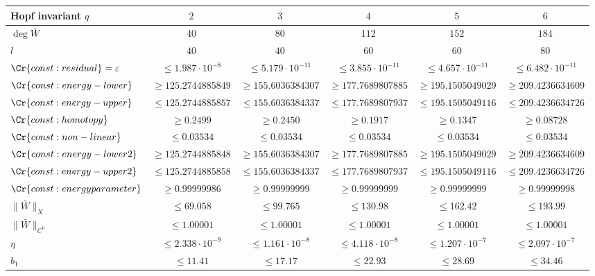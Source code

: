 \begin{table}[H]
\centering\small
\begin{tabular}{lccccc}
\toprule
Hopf invariant $q$ & $2$ & $3$ & $4$ & $5$ & $6$\\
\midrule
$\deg\bar W$ & $40$ & $80$ & $112$ & $152$ & $184$\\
$l$ & $40$ & $40$ & $60$ & $60$ & $80$\\
$\Cr{const:residual}=\varepsilon$ & $\le 1.987\cdot 10^{-8}$ & $\le 5.179\cdot 10^{-11}$ & $\le 3.855\cdot 10^{-11}$ & $\le 4.657\cdot 10^{-11}$ & $\le 6.482\cdot 10^{-11}$\\
$\Cr{const:energy-lower}$ & $\ge 125.2744885849$ & $\ge 155.6036384307$ & $\ge 177.7689807885$ & $\ge 195.1505049029$ & $\ge 209.4236634609$\\
$\Cr{const:energy-upper}$ & $\le 125.2744885857$ & $\le 155.6036384337$ & $\le 177.7689807937$ & $\le 195.1505049116$ & $\le 209.4236634726$\\
$\Cr{const:homotopy}$ & $\ge 0.2499$ & $\ge 0.2450$ & $\ge 0.1917$ & $\ge 0.1347$ & $\ge 0.08728$\\
$\Cr{const:non-linear}$ & $\le 0.03534$ & $\le 0.03534$ & $\le 0.03534$ & $\le 0.03534$ & $\le 0.03534$\\
$\Cr{const:energy-lower2}$ & $\ge 125.2744885848$ & $\ge 155.6036384307$ & $\ge 177.7689807885$ & $\ge 195.1505049029$ & $\ge 209.4236634609$\\
$\Cr{const:energy-upper2}$ & $\le 125.2744885858$ & $\le 155.6036384337$ & $\le 177.7689807937$ & $\le 195.1505049116$ & $\le 209.4236634726$\\
$\Cr{const:energyparameter}$ & $\ge 0.99999986$ & $\ge 0.99999999$ & $\ge 0.99999999$ & $\ge 0.99999999$ & $\ge 0.99999998$\\
$\|\bar W\|_X$ & $\le 69.058$ & $\le 99.765$ & $\le 130.98$ & $\le 162.42$ & $\le 193.99$\\
$\|\bar W\|_{C^0}$ & $\le 1.00001$ & $\le 1.00001$ & $\le 1.00001$ & $\le 1.00001$ & $\le 1.00001$\\
$\eta$ & $\le 2.338\cdot 10^{-9}$ & $\le 1.161\cdot 10^{-8}$ & $\le 4.118\cdot 10^{-8}$ & $\le 1.207\cdot 10^{-7}$ & $\le 2.097\cdot 10^{-7}$\\
$b_1$ & $\le 11.41$ & $\le 17.17$ & $\le 22.93$ & $\le 28.69$ & $\le 34.46$\\

\end{tabular}
\end{table}
